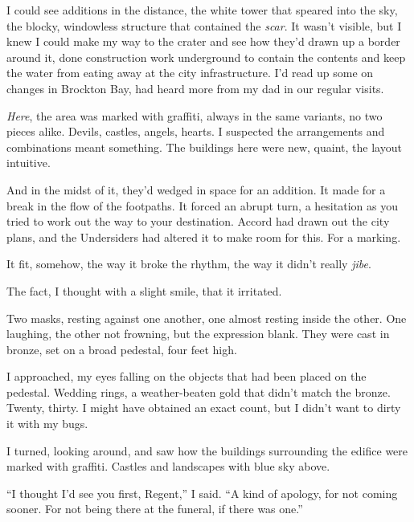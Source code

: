 I could see additions in the distance, the white tower that speared into the sky, the blocky, windowless structure that contained the \emph{scar}.  It wasn't visible, but I knew I could make my way to the crater and see how they'd drawn up a border around it, done construction work underground to contain the contents and keep the water from eating away at the city infrastructure.  I'd read up some on changes in Brockton Bay, had heard more from my dad in our regular visits.



\emph{Here}, the area was marked with graffiti, always in the same variants, no two pieces alike.  Devils, castles, angels, hearts.  I suspected the arrangements and combinations meant something.  The buildings here were new, quaint, the layout intuitive.



And in the midst of it, they'd wedged in space for an addition.  It made for a break in the flow of the footpaths.  It forced an abrupt turn, a hesitation as you tried to work out the way to your destination.  Accord had drawn out the city plans, and the Undersiders had altered it to make room for this.  For a marking.



It fit, somehow, the way it broke the rhythm, the way it didn't really \emph{jibe}.



The fact, I thought with a slight smile, that it irritated.



Two masks, resting against one another, one almost resting inside the other.  One laughing, the other not frowning, but the expression blank.  They were cast in bronze, set on a broad pedestal, four feet high.



I approached, my eyes falling on the objects that had been placed on the pedestal.  Wedding rings, a weather-beaten gold that didn't match the bronze.  Twenty, thirty.  I might have obtained an exact count, but I didn't want to dirty it with my bugs.



I turned, looking around, and saw how the buildings surrounding the edifice were marked with graffiti.  Castles and landscapes with blue sky above.



``I thought I'd see you first, Regent,'' I said.  ``A kind of apology, for not coming sooner.  For not being there at the funeral, if there was one.''



